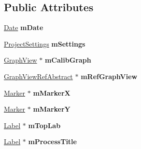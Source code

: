 \subsection*{Public Attributes}
\begin{DoxyCompactItemize}
\item 
\hypertarget{class_calibration_view_ab3c47515d69ff0e7594b1ac15d2ea491}{\hyperlink{class_date}{Date} {\bfseries m\-Date}}\label{class_calibration_view_ab3c47515d69ff0e7594b1ac15d2ea491}

\item 
\hypertarget{class_calibration_view_a571b8822ea31d62774daec86f82c7aee}{\hyperlink{class_project_settings}{Project\-Settings} {\bfseries m\-Settings}}\label{class_calibration_view_a571b8822ea31d62774daec86f82c7aee}

\item 
\hypertarget{class_calibration_view_a2c8103d74d18ac9292ee9606a8c6cc63}{\hyperlink{class_graph_view}{Graph\-View} $\ast$ {\bfseries m\-Calib\-Graph}}\label{class_calibration_view_a2c8103d74d18ac9292ee9606a8c6cc63}

\item 
\hypertarget{class_calibration_view_a28cd8e8d188c3e20fc073f81afb19e7b}{\hyperlink{class_graph_view_ref_abstract}{Graph\-View\-Ref\-Abstract} $\ast$ {\bfseries m\-Ref\-Graph\-View}}\label{class_calibration_view_a28cd8e8d188c3e20fc073f81afb19e7b}

\item 
\hypertarget{class_calibration_view_a50003776c969fec581ad1135dee7b8c5}{\hyperlink{class_marker}{Marker} $\ast$ {\bfseries m\-Marker\-X}}\label{class_calibration_view_a50003776c969fec581ad1135dee7b8c5}

\item 
\hypertarget{class_calibration_view_afa42e7b8fb0257c538a1ccb38d715b81}{\hyperlink{class_marker}{Marker} $\ast$ {\bfseries m\-Marker\-Y}}\label{class_calibration_view_afa42e7b8fb0257c538a1ccb38d715b81}

\item 
\hypertarget{class_calibration_view_a86b92fe22503472510a0ccbcc3855cc6}{\hyperlink{class_label}{Label} $\ast$ {\bfseries m\-Top\-Lab}}\label{class_calibration_view_a86b92fe22503472510a0ccbcc3855cc6}

\item 
\hypertarget{class_calibration_view_abe919d6e5c758b3b890181946460027a}{\hyperlink{class_label}{Label} $\ast$ {\bfseries m\-Process\-Title}}\label{class_calibration_view_abe919d6e5c758b3b890181946460027a}


\end{DoxyCompactItemize}
